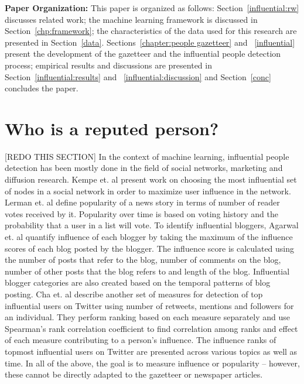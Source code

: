 \documentclass[a4paper,man,natbib]{apa6}
\begin{document}
\noindent \textbf{Paper Organization:} This paper is organized as follows: Section~\ref{influential:rw} discusses related work; the machine learning framework is discussed in Section~\ref{chp:framework}; the characteristics of the data used for this research are presented in Section~\ref{data}. Sections~\ref{chapter:people gazetteer} and ~\ref{influential} present the development of the gazetteer and the influential people detection process; empirical results and discussions are presented in Section~\ref{influential:results} and ~\ref{influential:discussion} and Section~\ref{conc} concludes the paper.

\section{Who is a reputed person?}
[REDO THIS SECTION]
In the context of machine learning, influential people detection has been mostly done in the field of social networks, marketing and diffusion research.
Kempe et. al \cite{kempe2003maximizing} present work on choosing the most influential set of nodes in a social network in order to maximize user influence in the network. 
Lerman et. al \cite{lerman2010using} define popularity of a news story in terms of number of reader votes received by it. Popularity over time is based on voting history and the probability that a user in a list will vote. To identify influential bloggers, Agarwal et. al\cite{agarwal2008identifying} quantify influence of each blogger by taking the maximum of the influence scores of each blog posted by the blogger. The influence score is calculated using the number of posts that refer to the blog, number of comments on the blog, number of other posts that the blog refers to and length of the blog. Influential blogger categories are also created based on the temporal patterns of blog posting. Cha et. al\cite{cha2010measuring} describe another set of measures for detection of top influential users on Twitter using number of retweets, mentions and followers for an individual. They perform ranking based on each measure separately and use Spearman's rank correlation coefficient to find correlation among ranks and effect of each measure contributing to a person's influence. The influence ranks of topmost influential users on Twitter are presented across various topics as well as time. In all of the above, the goal is to measure influence or popularity -- however, these cannot be directly adapted to the gazetteer or newspaper articles. 
\end{document}
